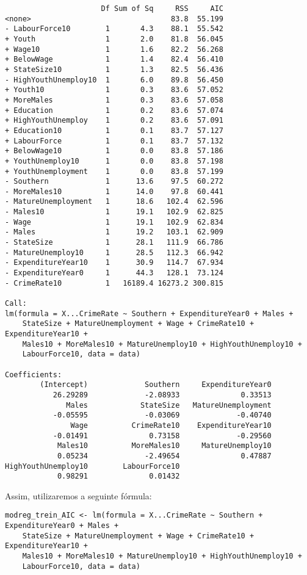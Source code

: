 \documentclass[11pt]{article}
\begin{document}
\begin{enumerate}
\begin{verbatim}
                      Df Sum of Sq     RSS     AIC
<none>                                83.8  55.199
- LabourForce10        1       4.3    88.1  55.542
+ Youth                1       2.0    81.8  56.045
+ Wage10               1       1.6    82.2  56.268
+ BelowWage            1       1.4    82.4  56.410
+ StateSize10          1       1.3    82.5  56.436
- HighYouthUnemploy10  1       6.0    89.8  56.450
+ Youth10              1       0.3    83.6  57.052
+ MoreMales            1       0.3    83.6  57.058
+ Education            1       0.2    83.6  57.074
+ HighYouthUnemploy    1       0.2    83.6  57.091
+ Education10          1       0.1    83.7  57.127
+ LabourForce          1       0.1    83.7  57.132
+ BelowWage10          1       0.0    83.8  57.186
+ YouthUnemploy10      1       0.0    83.8  57.198
+ YouthUnemployment    1       0.0    83.8  57.199
- Southern             1      13.6    97.5  60.272
- MoreMales10          1      14.0    97.8  60.441
- MatureUnemployment   1      18.6   102.4  62.596
- Males10              1      19.1   102.9  62.825
- Wage                 1      19.1   102.9  62.834
- Males                1      19.2   103.1  62.909
- StateSize            1      28.1   111.9  66.786
- MatureUnemploy10     1      28.5   112.3  66.942
- ExpenditureYear10    1      30.9   114.7  67.934
- ExpenditureYear0     1      44.3   128.1  73.124
- CrimeRate10          1   16189.4 16273.2 300.815

Call:
lm(formula = X...CrimeRate ~ Southern + ExpenditureYear0 + Males + 
    StateSize + MatureUnemployment + Wage + CrimeRate10 + ExpenditureYear10 + 
    Males10 + MoreMales10 + MatureUnemploy10 + HighYouthUnemploy10 + 
    LabourForce10, data = data)

Coefficients:
        (Intercept)             Southern     ExpenditureYear0  
           26.29289             -2.08933              0.33513  
              Males            StateSize   MatureUnemployment  
           -0.05595             -0.03069             -0.40740  
               Wage          CrimeRate10    ExpenditureYear10  
           -0.01491              0.73158             -0.29560  
            Males10          MoreMales10     MatureUnemploy10  
            0.05234             -2.49654              0.47887  
HighYouthUnemploy10        LabourForce10  
            0.98291              0.01432  

\end{verbatim}

Assim, utilizaremos a seguinte fórmula:
\begin{verbatim}
modreg_trein_AIC <- lm(formula = X...CrimeRate ~ Southern + ExpenditureYear0 + Males + 
    StateSize + MatureUnemployment + Wage + CrimeRate10 + ExpenditureYear10 + 
    Males10 + MoreMales10 + MatureUnemploy10 + HighYouthUnemploy10 + 
    LabourForce10, data = data)
\end{verbatim}


\end{enumerate}
\end{document}
